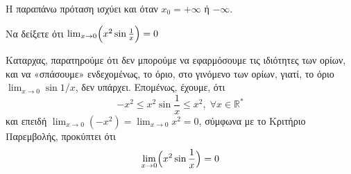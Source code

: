 
\begin{rem}
  Η παραπάνω πρόταση ισχύει και όταν $ x_{0} = + \infty $ ή $ - \infty $.
\end{rem}

\begin{example}
  Να δείξετε ότι $ \lim_{x \to 0} \Bigl(x^{2} \sin{\frac{1}{x}}\Bigr) = 0  $ 
\end{example}
\begin{solution}
  Καταρχας, παρατηρούμε ότι δεν μπορούμε να εφαρμόσουμε τις ιδιότητες των ορίων, και να 
  «σπάσουμε» ενδεχομένως, το όριο, στο γινόμενο των ορίων, γιατί, το όριο 
  $ \lim_{x \to 0} \sin{1/x} $, δεν υπάρχει.
  Επομένως, έχουμε, ότι
  \[
    - x^{2} \leq x^{2} \sin{\frac{1}{x}} \leq x^{2}, \; \forall x \in \mathbb{R}^{*}
  \]
  και επειδή $ \lim_{x \to 0} (-x^{2}) = \lim_{x \to 0} x^{2} = 0 $, σύμφωνα με το 
  Κριτήριο Παρεμβολής, προκύπτει ότι 
  \[
    \lim_{x \to 0} \Bigl(x^{2} \sin{\frac{1}{x}}\Bigr)  = 0
  \]
\end{solution}


